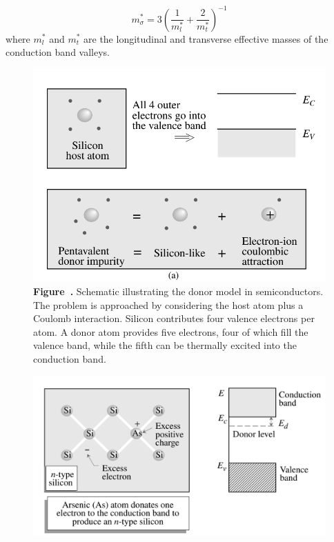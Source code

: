 \begin{equation}
	{m^*_\sigma} = 3\left( \frac{1}{m_l^*} + \frac{2}{m_t^*} \right)^{-1}
\end{equation}
\noindent
where \( m_l^* \) and \( m_t^* \) are the longitudinal and transverse effective masses of the conduction band valleys.\\
\begin{figure}[h!]
	\centering
	\begin{minipage}{0.44\textwidth}
		\centering
		\includegraphics[width=\textwidth]{img/donors&acceptors.png}
		\\[0.5em]
		\textbf{Figure~\thefigure.} \small Schematic illustrating the donor model in semiconductors. The problem is approached by considering the host atom plus a Coulomb interaction. Silicon contributes four valence electrons per atom. A donor atom provides five electrons, four of which fill the valence band, while the fifth can be thermally excited into the conduction band.
		\label{fig:donors&acceptors}
	\end{minipage}%
	\hfill
	\begin{minipage}{0.52\textwidth}
		\centering
		\includegraphics[width=\textwidth]{img/SiAs.png}

\end{minipage}
\end{figure}
